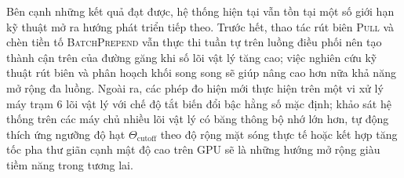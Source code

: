 Bên cạnh những kết quả đạt được, hệ thống hiện tại vẫn tồn tại một số giới hạn kỹ thuật mở ra hướng phát triển tiếp theo. Trước hết, thao tác rút biên \textsc{Pull} và chèn tiền tố \textsc{BatchPrepend} vẫn thực thi tuần tự trên luồng điều phối nên tạo thành cận trên của đường găng khi số lõi vật lý tăng cao; việc nghiên cứu kỹ thuật rút biên và phân hoạch khối song song sẽ giúp nâng cao hơn nữa khả năng mở rộng đa luồng. Ngoài ra, các phép đo hiện mới thực hiện trên một vi xử lý máy trạm $6$ lõi vật lý với chế độ tắt biến đổi bậc hằng số mặc định; khảo sát hệ thống trên các máy chủ nhiều lõi vật lý có băng thông bộ nhớ lớn hơn, tự động thích ứng ngưỡng độ hạt $\Theta_{\mathrm{cutoff}}$ theo độ rộng mặt sóng thực tế hoặc kết hợp tăng tốc pha thư giãn cạnh mật độ cao trên GPU sẽ là những hướng mở rộng giàu tiềm năng trong tương lai.

